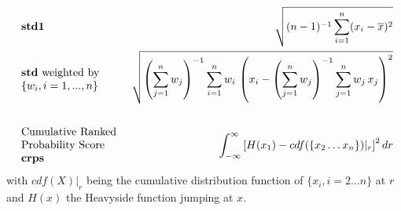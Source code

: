 {{\begin{eqnarray*}
\begin{array}{l}
\makebox[3cm][l]{{\bf std1}} \\
\end{array}
 &  &
\sqrt{ (n-1)^{-1} \sum_{i=1}^{n} (x_i - \overline{x})^2 }
\\
\begin{array}{l}
\makebox[3cm][l]{{\bf std} weighted by} \\
\{w_i, i=1, ..., n\}  \\
\end{array}
 & &
\sqrt{
  \left ( \sum_{j=1}^{n} w_j \right )^{-1} \sum\limits_{i=1}^{n} w_i \, 
  \left ( x_i - \left ( \sum_{j=1}^{n} w_j \right )^{-1} \sum\limits_{j=1}^{n} w_j \, x_j \right)^2 } \\
\\
\begin{array}{l}
\makebox[3cm][l]{Cumulative Ranked} \\
\makebox[3cm][l]{Probability Score} \\
\makebox[3cm][l]{{\bf crps}} \\
\end{array}
 &  &
\int_{-\infty}^{\infty} \left[ H(x_1) - cdf(\{x_2\ldots x_n\})|_{r} \right]^2 dr \\
\end{eqnarray*}
\hspace{1cm} with \(cdf(X)|_r\) being the cumulative distribution function of \(\{x_i,i=2\ldots n\}\) at \(r\)\\

\hspace{1cm} and \(H(x)\) the Heavyside function jumping at \(x\).

}}
